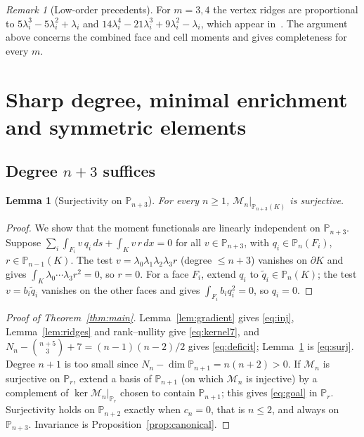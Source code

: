 \documentclass[11pt,a4paper]{article}
\newtheorem{lemma}[theorem]{Lemma}
\theoremstyle{definition}
\theoremstyle{remark}
\newtheorem{remark}[theorem]{Remark}
\newcommand{\M}{\mathcal M}
\newcommand{\Pol}{\mathbb P}
\begin{document}
\begin{remark}[Low-order precedents]
For \(m=3,4\) the vertex ridges are proportional to
\(5\lambda_i^3-5\lambda_i^2+\lambda_i\) and
\(14\lambda_i^4-21\lambda_i^3+9\lambda_i^2-\lambda_i\), which appear
in~\cite[Eqs.~(4), (11)]{CHZ2023}. The argument above concerns the combined
face and cell moments and gives completeness for every \(m\).
\end{remark}

\section{Sharp degree, minimal enrichment and symmetric elements}
\label{sec:construction}

\subsection{Degree \texorpdfstring{\(n+3\)}{n+3} suffices}

\begin{lemma}[Surjectivity on \(\Pol_{n+3}\)]
\label{lem:surj}
For every \(n\ge1\), \(\M_n|_{\Pol_{n+3}(K)}\) is surjective.
\end{lemma}

\begin{proof}
We show that the moment functionals are linearly independent on
\(\Pol_{n+3}\). Suppose
\(\sum_i\int_{F_i}v\,q_i\,ds+\int_Kv\,r\,dx=0\) for all \(v\in\Pol_{n+3}\),
with \(q_i\in\Pol_n(F_i)\), \(r\in\Pol_{n-1}(K)\). The test
\(v=\lambda_0\lambda_1\lambda_2\lambda_3r\) (degree \(\le n+3\)) vanishes on
\(\partial K\) and gives \(\int_K\lambda_0\cdots\lambda_3r^2=0\), so \(r=0\).
For a face \(F_i\), extend \(q_i\) to \(\tilde q_i\in\Pol_n(K)\); the test
\(v=b_i\tilde q_i\) vanishes on the other faces and gives
\(\int_{F_i}b_iq_i^2=0\), so \(q_i=0\).
\end{proof}

\begin{proof}[Proof of Theorem~\ref{thm:main}]
Lemma~\ref{lem:gradient} gives \eqref{eq:inj}, Lemma~\ref{lem:ridges}
and rank--nullity give \eqref{eq:kernel7}, and
\(N_n-\binom{n+5}3+7=(n-1)(n-2)/2\) gives \eqref{eq:deficit};
Lemma~\ref{lem:surj} is \eqref{eq:surj}. Degree \(n+1\) is too small since
\(N_n-\dim\Pol_{n+1}=n(n+2)>0\). If \(\M_n\) is surjective on \(\Pol_r\), extend
a basis of \(\Pol_{n+1}\) (on which \(\M_n\) is injective) by a complement of
\(\ker\M_n|_{\Pol_r}\) chosen to contain \(\Pol_{n+1}\); this gives
\eqref{eq:goal} in \(\Pol_r\). Surjectivity holds on \(\Pol_{n+2}\) exactly when
\(c_n=0\), that is \(n\le2\), and always on \(\Pol_{n+3}\). Invariance is
Proposition~\ref{prop:canonical}.
\end{proof}
\end{document}
